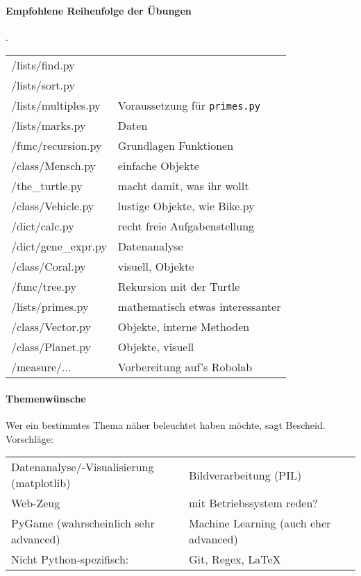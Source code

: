 \documentclass{article}
\begin{document}
\paragraph{Empfohlene Reihenfolge der Übungen} .\\
	\begin{tabular}{l|l}
		/lists/find.py \\
		/lists/sort.py \\
		/lists/multiples.py & Voraussetzung für \texttt{primes.py} \\
		/lists/marks.py & Daten \\
		/func/recursion.py & Grundlagen Funktionen \\
		/class/Mensch.py & einfache Objekte \\
		/the\_turtle.py & macht damit, was ihr wollt \\
		/class/Vehicle.py & lustige Objekte, wie Bike.py \\
		/dict/calc.py & recht freie Aufgabenstellung \\
		/dict/gene\_expr.py & Datenanalyse \\
		/class/Coral.py & visuell, Objekte \\
		/func/tree.py & Rekursion mit der Turtle \\
		/lists/primes.py & mathematisch etwas interessanter \\
		/class/Vector.py & Objekte, interne Methoden \\
		/class/Planet.py & Objekte, visuell \\
		/measure/... & Vorbereitung auf's Robolab \\
	\end{tabular}

\newpage
\paragraph{Themenwünsche}
	Wer ein bestimmtes Thema näher beleuchtet haben möchte, sagt Bescheid. Vorschläge: \\
	\begin{tabular}{ll}
		Datenanalyse/-Visualisierung (matplotlib) &
		Bildverarbeitung (PIL) \\
		Web-Zeug &
		mit Betriebssystem reden? \\
		PyGame (wahrscheinlich sehr advanced) &
		Machine Learning (auch eher advanced) \\
		Nicht Python-spezifisch: & Git, Regex, \LaTeX
	\end{tabular}
\end{document}
